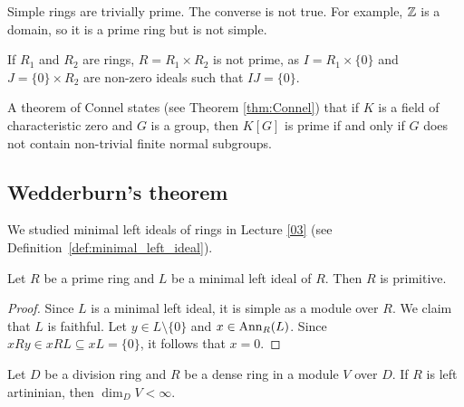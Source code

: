 Simple rings are trivially prime. The converse is not true. For example,
$\mathbb{Z}$ is a domain, so it is a prime ring but is not simple.

\begin{example}
	If $R_1$ and $R_2$ are rings, $R=R_1\times R_2$ is not prime, as 
	$I=R_1\times\{0\}$ and $J=\{0\}\times R_2$ are non-zero ideals such that $IJ=\{0\}$.
\end{example}

A theorem of Connel states (see Theorem \ref{thm:Connel}) that 
if $K$ is a field of characteristic zero and $G$ 
is a group, then $K[G]$ is prime if and only if 
$G$ does not contain non-trivial finite normal subgroups. 



\subsection{Wedderburn's theorem}

We studied minimal left ideals of rings in Lecture \ref{03} (see Definition~\ref{def:minimal_left_ideal}).  

\begin{lemma}
	\label{lem:primoizqmin=>prim}
	Let $R$ be a prime ring and $L$ be a minimal left ideal of $R$.
	Then $R$ is primitive. 
\end{lemma}

\begin{proof}
	Since $L$ is a minimal left ideal, it is simple as a module over $R$. 
	We claim that $L$ is faithful. Let $y\in L\setminus\{0\}$ and
	$x\in\operatorname{Ann}_R(L)$. Since $xRy\in xRL\subseteq xL=\{0\}$, it follows that 
	$x=0$.
\end{proof}

\begin{lemma}
	\label{lem:denso_artiniano}
	Let $D$ be a division ring and $R$ be a dense ring in a module $V$ over $D$. 
	If $R$ is left artininian, then $\dim_DV<\infty$.
\end{lemma}

